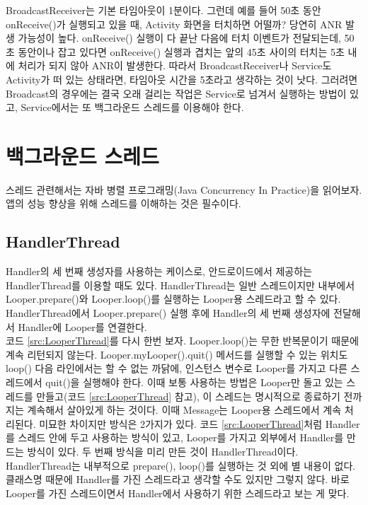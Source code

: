 BroadcastReceiver는 기본 타임아웃이 1분이다. 그런데 예를 들어 50초 동안 onReceive()가 실행되고 있을 때, Activity 화면을 터치하면 어떨까? 당연히 ANR 발생 가능성이 높다. onReceive() 실행이 다 끝난 다음에 터치 이벤트가 전달되는데, 50초 동안이나 잡고 있다면 onReceive() 실행과 겹치는 앞의 45초 사이의 터치는 5초 내에 처리가 되지 않아 ANR이 발생한다.
따라서 BroadcastReceiver나 Service도 Activity가 떠 있는 상태라면, 타임아웃 시간을 5초라고 생각하는 것이 낫다.
그러려면 Broadcast의 경우에는 결국 오래 걸리는 작업은 Service로 넘겨서 실행하는 방법이 있고, Service에서는 또 백그라운드 스레드를 이용해야 한다.\\


\chapter{백그라운드 스레드}
스레드 관련해서는 자바 병렬 프로그래밍(Java Concurrency In Practice)을 읽어보자. 앱의 성능 향상을 위해 스레드를 이해하는 것은 필수이다.

\section{HandlerThread}
Handler의 세 번째 생성자를 사용하는 케이스로, 안드로이드에서 제공하는 HandlerThread를 이용할 때도 있다.
HandlerThread는 일반 스레드이지만 내부에서 Looper.prepare()와 Looper.loop()를 실행하는 Looper용 스레드라고 할 수 있다.
HandlerThread에서 Looper.prepare() 실행 후에 Handler의 세 번째 생성자에 전달해서 Handler에 Looper를 연결한다.\\

코드 \ref{src:LooperThread}를 다시 한번 보자. Looper.loop()는 무한 반복문이기 때문에 계속 리턴되지 않는다.
Looper.myLoop\-er().quit() 메서드를 실행할 수 있는 위치도 loop() 다음 라인에서는 할 수 없는 까닭에, 인스턴스 변수로 Looper를 가지고 다른 스레드에서 quit()을 실행해야 한다.
이때 보통 사용하는 방법은 Looper만 돌고 있는 스레드를 만들고(코드 \ref{src:LooperThread} 참고), 이 스레드는 명시적으로 종료하기 전까지는 계속해서 살아있게 하는 것이다. 이때 Message는 Looper용 스레드에서 계속 처리된다.
미묘한 차이지만 방식은 2가지가 있다. 코드 \ref{src:LooperThread}처럼 Handler를 스레드 안에 두고 사용하는 방식이 있고, Looper를 가지고 외부에서 Handler를 만드는 방식이 있다. 
두 번째 방식을 미리 만든 것이 HandlerThread이다.
HandlerThread는 내부적으로 prepare(), loop()를 실행하는 것 외에 별 내용이 없다. 클래스명 때문에 Handler를 가진 스레드라고 생각할 수도 있지만 그렇지 않다. 바로 Looper를 가진 스레드이면서 Handler에서 사용하기 위한 스레드라고 보는 게 맞다.\\

